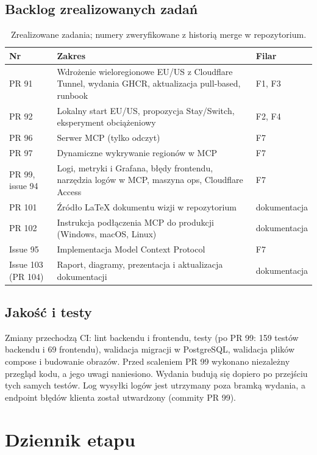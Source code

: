 \section{Backlog zrealizowanych zadań}
\begin{table}[H]
\centering\footnotesize
\begin{tabularx}{\textwidth}{@{}p{}Yl@{}}
\toprule
\textbf{Nr} & \textbf{Zakres} & \textbf{Filar} \\
\midrule
PR 91 & Wdrożenie wieloregionowe EU/US z Cloudflare Tunnel, wydania GHCR, aktualizacja pull-based, runbook & F1, F3 \\
PR 92 & Lokalny start EU/US, propozycja Stay/Switch, eksperyment obciążeniowy & F2, F4 \\
PR 96 & Serwer MCP (tylko odczyt) & F7 \\
PR 97 & Dynamiczne wykrywanie regionów w MCP & F7 \\
PR 99, issue 94 & Logi, metryki i Grafana, błędy frontendu, narzędzia logów w MCP, maszyna ops, Cloudflare Access & F7 \\
PR 101 & Źródło LaTeX dokumentu wizji w repozytorium & dokumentacja \\
PR 102 & Instrukcja podłączenia MCP do produkcji (Windows, macOS, Linux) & dokumentacja \\
Issue 95 & Implementacja Model Context Protocol & F7 \\
Issue 103 (PR 104) & Raport, diagramy, prezentacja i aktualizacja dokumentacji & dokumentacja \\
\bottomrule
\end{tabularx}
\caption{Zrealizowane zadania; numery zweryfikowane z historią merge w repozytorium.}
\end{table}

\section{Jakość i testy}
Zmiany przechodzą CI: lint backendu i frontendu, testy (po PR 99: 159 testów backendu i 69 frontendu),
walidacja migracji w PostgreSQL, walidacja plików compose i budowanie obrazów. Przed scaleniem PR 99 wykonano
niezależny przegląd kodu, a jego uwagi naniesiono. Wydania budują się dopiero po przejściu tych samych testów.
Log wysyłki logów jest utrzymany poza bramką wydania, a endpoint błędów klienta został utwardzony (commity
PR 99).

\chapter{Dziennik etapu}\label{ch:real-dziennik}


